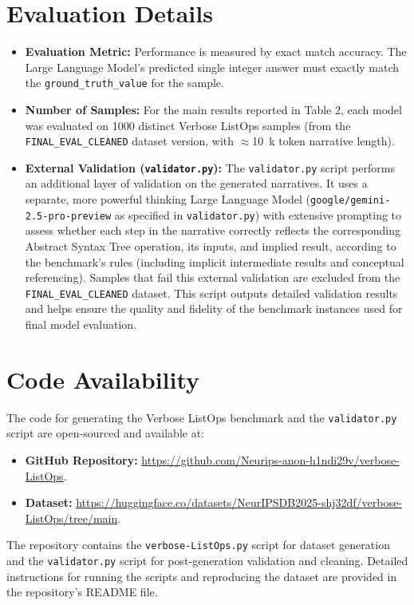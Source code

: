 \documentclass{article}
\begin{document}
\section{Evaluation Details}
\label{app:evaluation_details}
\begin{itemize}
  \item \textbf{Evaluation Metric:} Performance is measured by exact match accuracy. The Large Language Model's predicted single integer answer must exactly match the \texttt{ground\_truth\_value} for the sample.
  \item \textbf{Number of Samples:} For the main results reported in Table 2, each model was evaluated on 1000 distinct Verbose ListOps samples (from the \texttt{FINAL\_EVAL\_CLEANED} dataset version, with $\approx$\SI{10}{k} token narrative length).
  \item \textbf{External Validation (\texttt{validator.py}):} The \texttt{validator.py} script performs an additional layer of validation on the generated narratives. It uses a separate, more powerful thinking Large Language Model (\texttt{google/gemini-2.5-pro-preview} as specified in \texttt{validator.py}) with extensive prompting to assess whether each step in the narrative correctly reflects the corresponding Abstract Syntax Tree operation, its inputs, and implied result, according to the benchmark's rules (including implicit intermediate results and conceptual referencing). Samples that fail this external validation are excluded from the \texttt{FINAL\_EVAL\_CLEANED} dataset. This script outputs detailed validation results and helps ensure the quality and fidelity of the benchmark instances used for final model evaluation.
\end{itemize}

\section{Code Availability}
\label{app:code_availability}
The code for generating the Verbose ListOps benchmark and the \texttt{validator.py} script are open-sourced and available at:
\begin{itemize}
  \item \textbf{GitHub Repository:} \url{https://github.com/Neurips-anon-h1ndi29v/verbose-ListOps}.
  \item \textbf{Dataset:} \url{https://huggingface.co/datasets/NeurIPSDB2025-shj32df/verbose-ListOps/tree/main}.
\end{itemize}
The repository contains the \texttt{verbose-ListOps.py} script for dataset generation and the \texttt{validator.py} script for post-generation validation and cleaning. Detailed instructions for running the scripts and reproducing the dataset are provided in the repository's README file.
\end{document}

